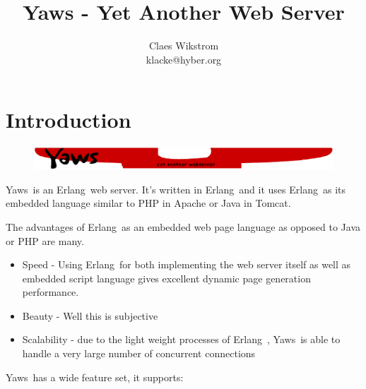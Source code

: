 \documentclass[11pt,oneside,english]{book}
\newcommand{\Erlang}            %
        {{\sc Erlang}}
\newcommand{\Yaws}            %
        {{\sc Yaws}}
\begin{document}
\title{Yaws - Yet Another Web Server}


\author{Claes Wikstrom\\
klacke@hyber.org}





\maketitle
\tableofcontents{}



\chapter{Introduction}


\begin{figure}[h]
\begin{center}

 \includegraphics[scale=0.6] {yaws_head}

\end{center}
\end{figure}

\Yaws\  is an \Erlang\  web server. It's written in \Erlang\  and it uses
\Erlang\  as its embedded language similar to PHP in Apache or Java in Tomcat.

The advantages of \Erlang\  as an embedded web page language as opposed to
Java or PHP are many.
\begin{itemize}

\item{Speed - Using \Erlang\  for both implementing the web server itself as well
as embedded script language gives excellent dynamic page generation
performance.}

\item{Beauty - Well this is subjective}

\item{Scalability - due to the light weight processes of \Erlang\ , \Yaws\
is able to handle a very large number of concurrent connections}

\end{itemize}

\Yaws\  has a wide feature set, it supports:
\end{document}

